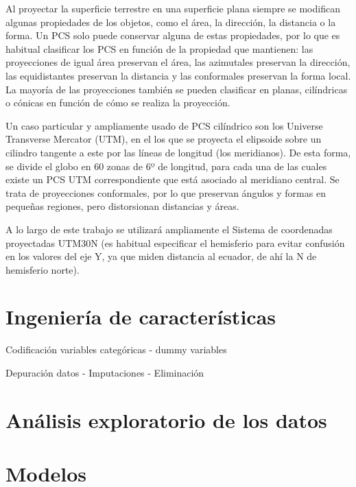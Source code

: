\documentclass[12pt,a4paper,]{book}
\newcounter{dummy}
\numberwithin{dummy}{section}
\theoremstyle{ocrenumbox}
\theoremstyle{blacknumex}
\theoremstyle{blacknumbox}
\theoremstyle{ocrenum}
\theoremstyle{ocrenum}
\begin{document}
Al proyectar la superficie terrestre en una superficie plana siempre se
modifican algunas propiedades de los objetos, como el área, la
dirección, la distancia o la forma. Un PCS solo puede conservar alguna
de estas propiedades, por lo que es habitual clasificar los PCS en
función de la propiedad que mantienen: las proyecciones de igual área
preservan el área, las azimutales preservan la dirección, las
equidistantes preservan la distancia y las conformales preservan la
forma local. La mayoría de las proyecciones también se pueden clasificar
en planas, cilíndricas o cónicas en función de cómo se realiza la
proyección.

Un caso particular y ampliamente usado de PCS cilíndrico son los
Universe Transverse Mercator (UTM), en el los que se proyecta el
elipsoide sobre un cilindro tangente a este por las líneas de longitud
(los meridianos). De esta forma, se divide el globo en 60 zonas de 6º de
longitud, para cada una de las cuales existe un PCS UTM correspondiente
que está asociado al meridiano central. Se trata de proyecciones
conformales, por lo que preservan ángulos y formas en pequeñas regiones,
pero distorsionan distancias y áreas.

A lo largo de este trabajo se utilizará ampliamente el Sistema de
coordenadas proyectadas UTM30N (es habitual especificar el hemisferio
para evitar confusión en los valores del eje Y, ya que miden distancia
al ecuador, de ahí la N de hemisferio norte).

\hypertarget{ingenieruxeda-de-caracteruxedsticas}{%
\section{Ingeniería de
características}\label{ingenieruxeda-de-caracteruxedsticas}}

Codificación variables categóricas - dummy variables

Depuración datos - Imputaciones - Eliminación

\hypertarget{anuxe1lisis-exploratorio-de-los-datos}{%
\section{Análisis exploratorio de los
datos}\label{anuxe1lisis-exploratorio-de-los-datos}}

\hypertarget{modelos}{%
\section{Modelos}\label{modelos}}
\end{document}
